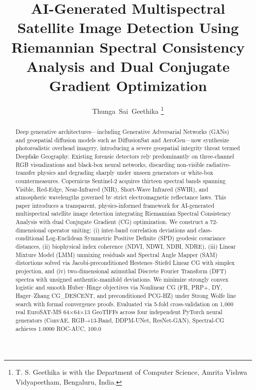 \documentclass[journal]{IEEEtran}
\begin{document}
\title{AI-Generated Multispectral Satellite Image Detection Using Riemannian Spectral Consistency Analysis and Dual Conjugate Gradient Optimization}
\author{Thunga~Sai~Geethika%
\thanks{T. S. Geethika is with the Department of Computer Science, Amrita Vishwa Vidyapeetham, Bengaluru, India.}}
\maketitle

\begin{abstract}
Deep generative architectures—including Generative Adversarial Networks (GANs) and geospatial diffusion models such as DiffusionSat and AeroGen—now synthesize photorealistic overhead imagery, introducing a severe geospatial integrity threat termed Deepfake Geography. Existing forensic detectors rely predominantly on three-channel RGB visualizations and black-box neural networks, discarding non-visible radiative-transfer physics and degrading sharply under unseen generators or white-box countermeasures. Copernicus Sentinel-2 acquires thirteen spectral bands spanning Visible, Red-Edge, Near-Infrared (NIR), Short-Wave Infrared (SWIR), and atmospheric wavelengths governed by strict electromagnetic reflectance laws. This paper introduces a transparent, physics-informed framework for AI-generated multispectral satellite image detection integrating Riemannian Spectral Consistency Analysis with dual Conjugate Gradient (CG) optimization. We construct a 72-dimensional operator uniting: (i) inter-band correlation deviations and class-conditional Log-Euclidean Symmetric Positive Definite (SPD) geodesic covariance distances, (ii) biophysical index coherence (NDVI, NDWI, NDBI, NDRE), (iii) Linear Mixture Model (LMM) unmixing residuals and Spectral Angle Mapper (SAM) distortions solved via Jacobi-preconditioned Hestenes–Stiefel Linear CG with simplex projection, and (iv) two-dimensional azimuthal Discrete Fourier Transform (DFT) spectra with unsigned authentic-manifold deviations. We minimize strongly convex logistic and smooth Huber–Hinge objectives via Nonlinear CG (FR, PRP+, DY, Hager–Zhang CG_DESCENT, and preconditioned PCG-HZ) under Strong Wolfe line search with formal convergence proofs. Evaluated via 5-fold cross-validation on 1,000 real EuroSAT-MS 64×64×13 GeoTIFFs across four independent PyTorch neural generators (ConvAE, RGB→13-Band, DDPM-UNet, ResNet-GAN), Spectral-CG achieves 1.0000 ROC-AUC, 100.0%
\end{abstract}
\end{document}
